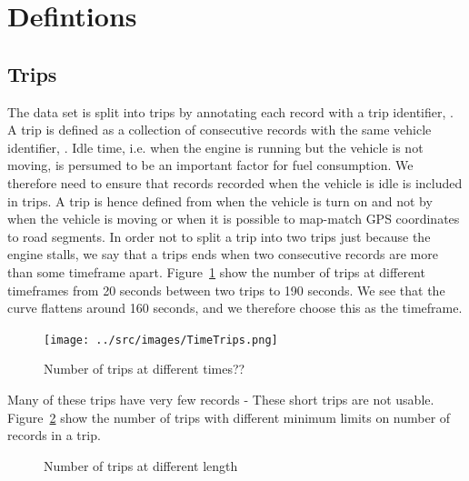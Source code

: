 \section{Defintions}
\subsection{Trips}
The data set is split into trips by annotating each record with a trip identifier, \tid.
A trip is defined as a collection of consecutive records with the same vehicle identifier, \vid.
Idle time, i.e. when the engine is running but the vehicle is not moving, is persumed to be an important factor for fuel consumption. 
We therefore need to ensure that records recorded when the vehicle is idle is included in trips. 
A trip is hence defined from when the vehicle is turn on and not by when the vehicle is moving or when it is possible to map-match GPS coordinates to road segments.
In order not to split a trip into two trips just because the engine stalls, we say that a trips ends when two consecutive records are more than some timeframe apart.
Figure~\ref{fig:TimeTrips} show the number of trips at different timeframes from 20 seconds between two trips to 190 seconds.
We see that the curve flattens around 160 seconds, and we therefore choose this as the timeframe. %
\begin{figure}[htb]
\centering
\texttt{[image: ../src/images/TimeTrips.png]}
\caption{Number of trips at different times??}
\label{fig:TimeTrips}
\end{figure}

Many of these trips have very few records - %
These short trips are not usable.
Figure~\ref{fig:LengthTrips} show the number of trips with different minimum limits on number of records in a trip.
\begin{figure}[htb]
\centering
\caption{Number of trips at different length}
\label{fig:LengthTrips}
\end{figure}



